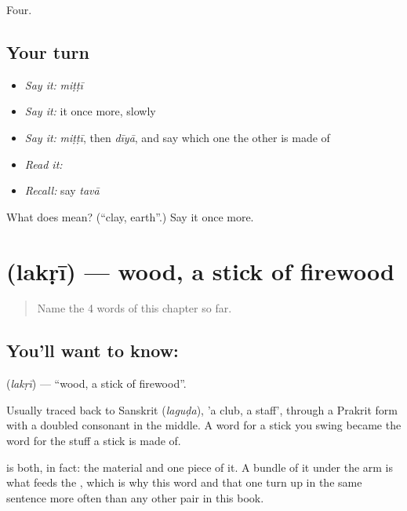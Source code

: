 \begin{grammarlens}[title={What you've built}]
Four.
\end{grammarlens}

\subsection*{Your turn}
\begin{itemize}
\raggedright
  \item \emph{Say it:} \emph{miṭṭī}
  \item \emph{Say it:} it once more, slowly
  \item \emph{Say it:} \emph{miṭṭī}, then \emph{dīyā}, and say which one the other is made of
  \item \emph{Read it:} \textbf{}
  \item \emph{Recall:} say \emph{tavā}
\end{itemize}

\begin{tcolorbox}[breakable,colback=teal!4,colframe=teal!35!black,title={Before you move on}]
What does  mean? (\textquotedblleft{}clay, earth\textquotedblright{}.) Say it once more.
\end{tcolorbox}
\section[\texorpdfstring{\hi{लकड़ी} (lakṛī)}{लकड़ी (lakṛī)}]{ (lakṛī) — wood, a stick of firewood}

\label{lesson:HI-C62-wood}



\begin{quote}
Name the 4 words of this chapter so far.
\end{quote}

\subsection*{You'll want to know: }
\textbf{} (\emph{lakṛī}) — \textquotedblleft{}wood, a stick of firewood\textquotedblright{}.

Usually traced back to Sanskrit  (\emph{laguḍa}), 'a club, a staff', through a Prakrit form with a doubled consonant in the middle. A word for a stick you swing became the word for the stuff a stick is made of.

 is both, in fact: the material and one piece of it. A bundle of it under the arm is what feeds the , which is why this word and that one turn up in the same sentence more often than any other pair in this book.

